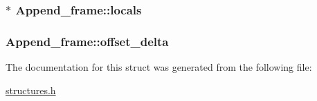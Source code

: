 \subsubsection[{\texorpdfstring{locals}{locals}}]{$\ast$ Append\+\_\+frame\+::locals}\hypertarget{structAppend__frame_ad05887fedeaec3902dd866e10aa7d192}{}\label{structAppend__frame_ad05887fedeaec3902dd866e10aa7d192}
\subsubsection[{\texorpdfstring{offset\+\_\+delta}{offset_delta}}]{ Append\+\_\+frame\+::offset\+\_\+delta}\hypertarget{structAppend__frame_a8a6963561a77d764146805d9d99bd61a}{}\label{structAppend__frame_a8a6963561a77d764146805d9d99bd61a}


The documentation for this struct was generated from the following file\+:\begin{DoxyCompactItemize}
\item 
\hyperlink{structures_8h}{structures.\+h}\end{DoxyCompactItemize}
